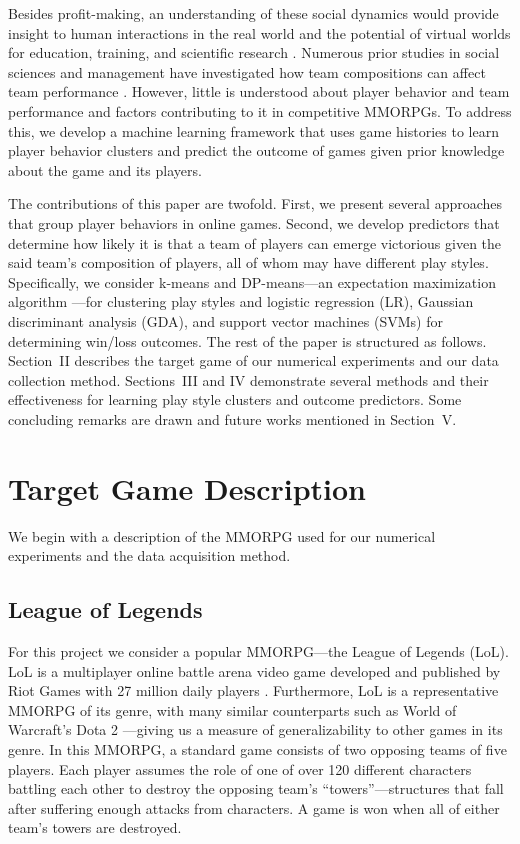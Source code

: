 \documentclass[letterpaper,10 pt,conference]{ieeeconf}
\begin{document}
Besides profit-making, an understanding of these social dynamics would provide insight to human interactions in the real world and the potential of virtual worlds for education, training, and scientific research \cite{Bai:12,Dic:05}. Numerous prior studies in social sciences and management have investigated how team compositions can affect team performance \cite{Spo:11,HA:08}. However, little is understood about player behavior and team performance and factors contributing to it in competitive MMORPGs. To address this, we develop a machine learning framework that uses game histories to learn player behavior clusters and predict the outcome of games given prior knowledge about the game and its players. 

The contributions of this paper are twofold. First, we present several approaches that group player behaviors in online games. Second, we develop predictors that determine how likely it is that a team of players can emerge victorious given the said team's composition of players, all of whom may have different play styles. Specifically, we consider k-means and DP-means---an expectation maximization algorithm \cite{KJ:12}---for clustering play styles and logistic regression (LR), Gaussian discriminant analysis (GDA), and support vector machines (SVMs) for determining win/loss outcomes. The rest of the paper is structured as follows. Section~II describes the target game of our numerical experiments and our data collection method. Sections~III and IV demonstrate several methods and their effectiveness for learning play style clusters and outcome predictors. Some concluding remarks are drawn and future works mentioned in Section~V.

\section{Target Game Description}

We begin with a description of the MMORPG used for our numerical experiments and the data acquisition method.

\subsection{League of Legends}

For this project we consider a popular MMORPG---the League of Legends (LoL). LoL is a multiplayer online battle arena video game developed and published by Riot Games with 27 million daily players \cite{Tas:14}. Furthermore, LoL is a representative MMORPG of its genre, with many similar counterparts such as World of Warcraft's Dota 2 \cite{Suz:09}---giving us a measure of generalizability to other games in its genre. In this MMORPG, a standard game consists of two opposing teams of five players. Each player assumes the role of one of over 120 different characters battling each other to destroy the opposing team's ``towers''---structures that fall after suffering enough attacks from characters. A game is won when all of either team's towers are destroyed. 
\end{document}
